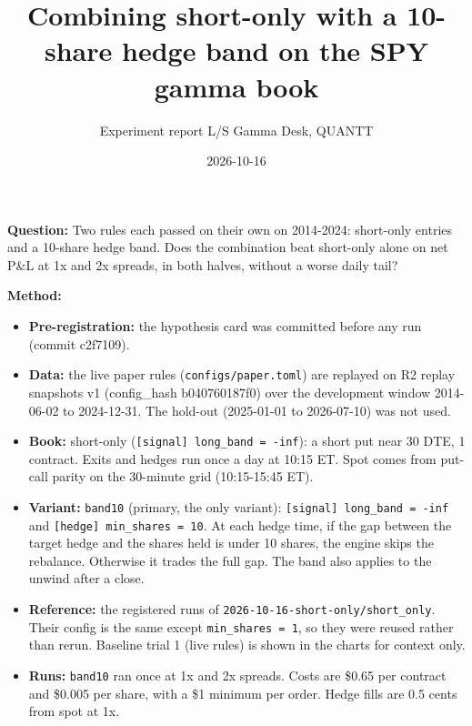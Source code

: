 \documentclass{article}
\title{Combining short-only with a 10-share hedge band on the SPY gamma book}
\author{Experiment report \textperiodcentered{} L/S Gamma Desk, QUANTT}
\date{2026-10-16}
\begin{document}
\maketitle

\textbf{Question:} Two rules each passed on their own on 2014-2024: short-only entries and a 10-share hedge band. Does the combination beat short-only alone on net P\&L at 1x and 2x spreads, in both halves, without a worse daily tail?

\textbf{Method:}

\begin{itemize}

\item \textbf{Pre-registration:} the hypothesis card was committed before any run (commit c2f7109).

\item \textbf{Data:} the live paper rules (\texttt{configs/\allowbreak{}paper.\allowbreak{}toml}) are replayed on R2 replay snapshots v1 (config\_hash b040760187f0) over the development window 2014-06-02 to 2024-12-31. The hold-out (2025-01-01 to 2026-07-10) was not used.

\item \textbf{Book:} short-only (\texttt{[signal] long\_\allowbreak{}band = -\allowbreak{}inf}): a short put near 30 DTE, 1 contract. Exits and hedges run once a day at 10:15 ET. Spot comes from put-call parity on the 30-minute grid (10:15-15:45 ET).

\item \textbf{Variant:} \texttt{band10} (primary, the only variant): \texttt{[signal] long\_\allowbreak{}band = -\allowbreak{}inf} and \texttt{[hedge] min\_\allowbreak{}shares = 10}. At each hedge time, if the gap between the target hedge and the shares held is under 10 shares, the engine skips the rebalance. Otherwise it trades the full gap. The band also applies to the unwind after a close.

\item \textbf{Reference:} the registered runs of \texttt{2026-\allowbreak{}10-\allowbreak{}16-\allowbreak{}short-\allowbreak{}only/\allowbreak{}short\_\allowbreak{}only}. Their config is the same except \texttt{min\_\allowbreak{}shares = 1}, so they were reused rather than rerun. Baseline trial 1 (live rules) is shown in the charts for context only.

\item \textbf{Runs:} \texttt{band10} ran once at 1x and 2x spreads. Costs are \$0.65 per contract and \$0.005 per share, with a \$1 minimum per order. Hedge fills are 0.5 cents from spot at 1x.

\end{itemize}
\end{document}
